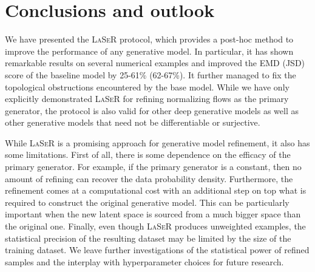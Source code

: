 \section{Conclusions and outlook}
\label{sec:conclusion}

We have presented the \textsc{LaSeR} protocol, which provides a post-hoc method to improve the performance of any generative model. In particular, it has shown remarkable results on several numerical examples and improved the EMD (JSD) score of the baseline model by 25-61\% (62-67\%). It further managed to fix the topological obstructions encountered by the base model.  While we have only explicitly demonstrated \textsc{LaSeR} for refining normalizing flows as the primary generator, the protocol is also valid for other deep generative models as well as other generative models that need not be differentiable or surjective.

While \textsc{LaSeR} is a promising approach for generative model refinement, it also has some limitations.  First of all, there is some dependence on the efficacy of the primary generator. For example, if the primary generator is a constant, then no amount of refining can recover the data probability density.  Furthermore, the refinement comes at a computational cost with an additional step on top what is required to construct the original generative model.  This can be particularly important when the new latent space is sourced from a much bigger space than the original one.  Finally, even though \textsc{LaSeR} produces unweighted examples, the statistical precision of the resulting dataset may be limited by the size of the training dataset.  We leave further investigations of the statistical power of refined samples and the interplay with hyperparameter choices for future research.


%
